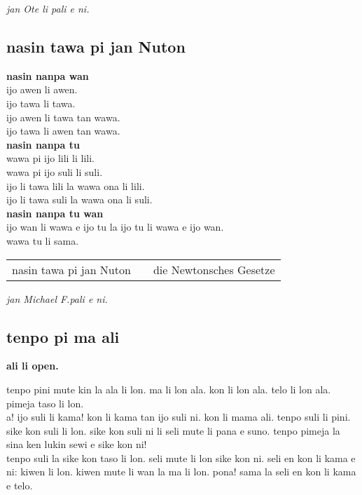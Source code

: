 \textit{jan Ote li pali e ni. \cite{www:olukin:01}}
%
\newpage
\subsection{nasin tawa pi jan Nuton}

\textbf{nasin nanpa wan}    \\
ijo awen li awen.    \\
ijo tawa li tawa.    \\
ijo awen li tawa tan wawa.    \\
ijo tawa li awen tan wawa.  \\
\textbf{nasin nanpa tu}    \\
wawa pi ijo lili li lili.    \\
wawa pi ijo suli li suli.    \\
ijo li tawa lili la wawa ona li lili.    \\
ijo li tawa suli la wawa ona li suli.    \\
\textbf{nasin nanpa tu wan}    \\
ijo wan li wawa e ijo tu la ijo tu li wawa e ijo wan.    \\
wawa tu li sama.

\begin{supertabular}{p{5,5cm}|ll}
nasin tawa pi jan Nuton &&  die Newtonsches Gesetze \\
\end{supertabular}

\textit{jan \glqq Michael F.\grqq   pali e ni. \cite{www:failbluedot:01}}

%
\subsection{tenpo pi ma ali}

\textbf{ali li open.} 

tenpo pini mute kin la ala li lon. ma li lon ala. kon li lon ala. telo li lon ala. pimeja taso li lon. \\
a! ijo suli li kama! kon li kama tan ijo suli ni. kon li mama ali. tenpo suli li pini. sike kon suli li lon. sike kon suli ni li seli mute li pana e suno. tenpo pimeja la sina ken lukin sewi e sike kon ni! \\
tenpo suli la sike kon taso li lon. seli mute li lon sike kon ni. seli en kon li kama e ni: kiwen li lon. kiwen mute li wan la ma li lon. pona! sama la seli en kon li kama e telo.

